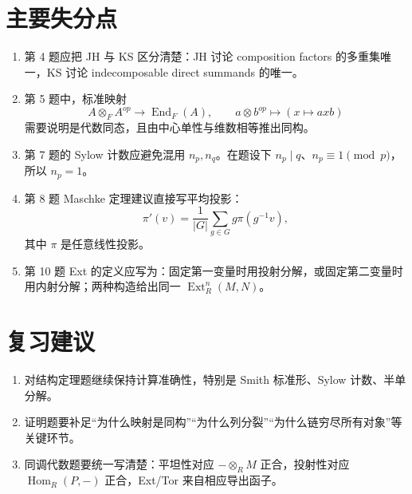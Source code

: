 \documentclass[11pt]{article}
\begin{document}
\section*{主要失分点}

\begin{enumerate}
  \item 第 4 题应把 JH 与 KS 区分清楚：JH 讨论 composition factors 的多重集唯一，KS 讨论 indecomposable direct summands 的唯一。
  \item 第 5 题中，标准映射
  \[
    A\otimes_F A^{op}\longrightarrow \operatorname{End}_F(A),\qquad
    a\otimes b^{op}\mapsto (x\mapsto axb)
  \]
  需要说明是代数同态，且由中心单性与维数相等推出同构。
  \item 第 7 题的 Sylow 计数应避免混用 \(n_p,n_q\)。在题设下 \(n_p\mid q\)、\(n_p\equiv1\pmod p\)，所以 \(n_p=1\)。
  \item 第 8 题 Maschke 定理建议直接写平均投影：
  \[
    \pi'(v)=\frac1{|G|}\sum_{g\in G}g\pi(g^{-1}v),
  \]
  其中 \(\pi\) 是任意线性投影。
  \item 第 10 题 Ext 的定义应写为：固定第一变量时用投射分解，或固定第二变量时用内射分解；两种构造给出同一 \(\operatorname{Ext}_R^n(M,N)\)。
\end{enumerate}

\section*{复习建议}

\begin{enumerate}
  \item 对结构定理题继续保持计算准确性，特别是 Smith 标准形、Sylow 计数、半单分解。
  \item 证明题要补足“为什么映射是同构”“为什么列分裂”“为什么链穷尽所有对象”等关键环节。
  \item 同调代数题要统一写清楚：平坦性对应 \(-\otimes_R M\) 正合，投射性对应 \(\operatorname{Hom}_R(P,-)\) 正合，Ext/Tor 来自相应导出函子。
\end{enumerate}
\end{document}

